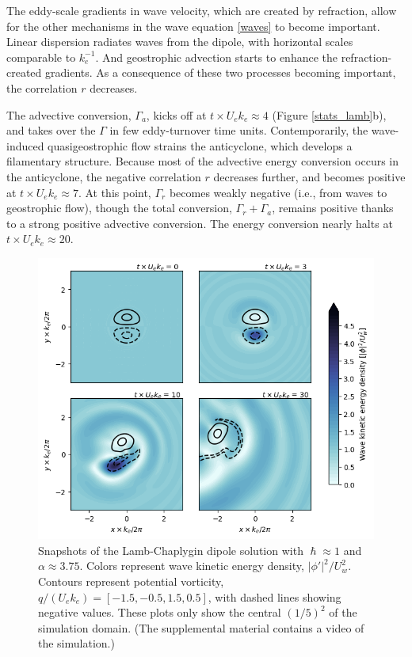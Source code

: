 \documentclass{jfm}
\begin{document}
The eddy-scale gradients in wave velocity, which are created by refraction,
 allow for the other mechanisms in the wave equation \eqref{waves} to become
 important. Linear dispersion radiates waves from the dipole, with horizontal
scales comparable to $k_e^{-1}$. And geostrophic advection starts to enhance
 the refraction-created gradients. As a consequence of these two processes becoming
 important, the correlation $r$ decreases.

The advective conversion, $\Gamma_a$, kicks
off at $t\times U_e k_e \approx 4$ (Figure \ref{stats_lamb}b), and takes over
the $\Gamma$ in few eddy-turnover time units. Contemporarily, the wave-induced
quasigeostrophic flow strains the anticyclone, which develops a filamentary structure.
Because most of the advective energy conversion occurs in the anticyclone, the
negative correlation $r$ decreases further, and becomes positive at
$t\times U_e k_e \approx 7$. At this point, $\Gamma_r$ becomes weakly negative
(i.e., from waves to geostrophic flow), though the total conversion, $\Gamma_r
+ \Gamma_a$, remains positive thanks to a strong positive advective conversion.
The energy conversion nearly halts at $t\times U_e k_e \approx 20$.

\begin{figure}
\label{snaps_lamb}
\centering
\includegraphics[width=.925\textwidth]{figs/fig1.png}
\caption{Snapshots of the Lamb-Chaplygin dipole solution with $\hslash \approx 1$
        and $\alpha \approx 3.75$. Colors represent wave kinetic energy density,
         $|\phi'|^2/U_w^2$.
        Contours represent potential vorticity, $q / (U_e k_e) = [
        -1.5,-0.5,1.5,0.5]$, with dashed lines showing negative values.
        These plots only show the central $(1/5)^2$
        of the simulation domain. (The supplemental material contains a video
        of the simulation.)}
\end{figure}
\end{document}
